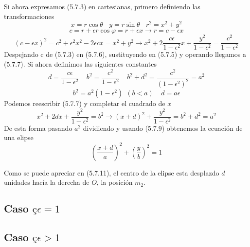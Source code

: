 Si ahora expresamos (5.7.3) en cartesianas, primero definiendo las transformaciones
\begin{equation} \label{5.1.5}
    x = r\cos\theta \ \ \ \ y = r\sin \theta \ \ \ \ r^2=x^2+y^2
\end{equation} 
\vspace{-15pt}
\begin{equation} \label{5.1.6}
    c = r +\epsilon r \cos\varphi = r+\epsilon x \rightarrow r = c-\epsilon x
\end{equation} 
\vspace{-20pt}
\begin{equation} \label{5.1.7}
    (c-\epsilon x)^2 = c^2 + \epsilon^2 x^2 -2\epsilon c x = x^2 + y^2 \rightarrow x^2 +2 \frac{c\epsilon}{1-\epsilon^2}x +\frac{y^2}{1-\epsilon^2}=\frac{c^2}{1-\epsilon^2}
\end{equation} 
Despejando c de (5.7.3) en (5.7.6), sustituyendo en (5.7.5) y operando llegamos a (5.7.7). Si ahora definimos las siguientes constantes
\begin{equation} \label{5.1.8}
    d = \frac{c\epsilon}{1-\epsilon^2} \ \ \ \ \ b^2 = \frac{c^2}{1-\epsilon^2} \ \ \ \ \ b^2 + d^2 = \frac{c^2}{(1-\epsilon^2)^2} = a^2
\end{equation} 
\vspace{-15pt}
\begin{equation} \label{5.1.8}
    b^2 = a^2(1-\epsilon^2) \ \ (b<a) \ \ \ \ \ d=a\epsilon
\end{equation} 
Podemos reescribir (5.7.7) y completar el cuadrado de $x$
\begin{equation} \label{5.1.7}
    x^2 +2dx +\frac{y^2}{1-\epsilon^2}=b^2 \rightarrow (x+d)^2 +\frac{y^2}{1-\epsilon^2}=b^2 + d^2 = a^2
\end{equation} 
De esta forma pasando $a^2$ dividiendo y usando (5.7.9) obtenemos la ecuación de una elipse
\begin{equation} \label{5.1.7}
    \left(\frac{x+d}{a}\right)^2 +\left(\frac{y}{b}\right)^2=1
\end{equation} 
\begin{figure}[H]
    \def\svgwidth{15 cm}
    \normalsize
	
\end{figure}
\vspace{-40pt}
Como se puede apreciar en (5.7.11), el centro de la elipse esta desplazdo $d$ unidades hacía la derecha de $O$, la posición $m_2$.
\subsection{Caso $ç\epsilon = 1 $}
\subsection{Caso $ç\epsilon > 1 $}

